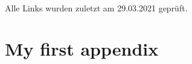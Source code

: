 \documentclass[
  fontsize=10pt,
  numbers=noenddot,
  english,  %
  paper=a5,
  twoside,  %
  DIV=calc,
  headings=small,
  bibliography=totoc,
  listof=totoc,
  draft=false
]{scrbook}
\theoremstyle{break}
\begin{document}
\ \\
%
\noindent
Alle Links wurden zuletzt am 29.03.2021 geprüft.



\clearpage
\appendix

\chapter{My first appendix}\label{sec:appendix1}

\lipsum[1]

\pagestyle{empty}
\renewcommand*{\chapterpagestyle}{empty}
\end{document}

